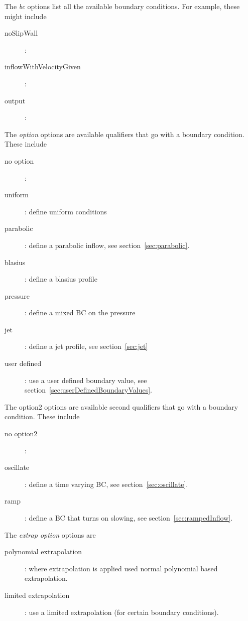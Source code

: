 \noindent The {\em bc} options list all the available boundary conditions. For example, these might include 
\begin{description}
  \item[\qquad noSlipWall] : 
  \item[\qquad inflowWithVelocityGiven] : 
  \item[\qquad output] : 
\end{description}

\noindent The {\em option} options are available qualifiers that go with a boundary condition. These include
\begin{description}
  \item[\qquad no option] : 
  \item[\qquad uniform] : define uniform conditions
  \item[\qquad parabolic] : define a parabolic inflow, see section~\ref{sec:parabolic}.
  \item[\qquad blasius] :  define a blasius profile
  \item[\qquad pressure] : define a mixed BC on the pressure
  \item[\qquad jet] : define a jet profile, see section~\ref{sec:jet}
  \item[\qquad user defined] : use a user defined boundary value, see section~\ref{sec:userDefinedBoundaryValues}.
\end{description}

\noindent The {\em } option2 options are available second qualifiers that go with a boundary condition. These include
\begin{description}
  \item[\qquad no option2] : 
  \item[\qquad oscillate] : define a time varying BC, see section~\ref{sec:oscillate}.
  \item[\qquad ramp] : define a BC that turns on slowing, see section~\ref{sec:rampedInflow}.
\end{description}


\noindent The {\em extrap option} options are
\begin{description}
  \item[\qquad polynomial extrapolation] : where extrapolation is applied used normal polynomial based extrapolation.
  \item[\qquad limited extrapolation] : use a limited extrapolation (for certain boundary conditions).
\end{description}

